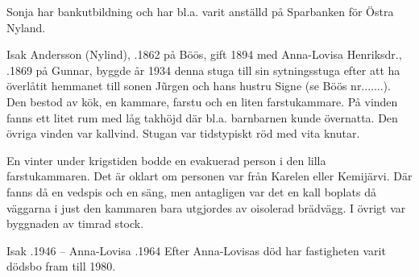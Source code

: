Sonja har bankutbildning och har bl.a. varit anställd på Sparbanken för Östra Nyland.


Isak Andersson (Nylind), .1862 på Böös, gift 1894 med Anna-Lovisa Henriksdr., .1869 på Gunnar, byggde år 1934 denna stuga till sin sytningsstuga efter att ha överlåtit hemmanet till sonen Jũrgen och hans hustru Signe (se Böös nr.......). Den bestod av kök, en kammare, farstu och en liten farstukammare. På vinden fanns ett litet rum med låg takhöjd där bl.a. barnbarnen kunde övernatta. Den övriga vinden var kallvind. Stugan var tidstypiskt röd med vita knutar.

En vinter under krigstiden bodde en evakuerad person i den lilla farstukammaren. Det är oklart om personen var från Karelen eller Kemijärvi. Där fanns då en vedspis och en säng, men antagligen var det en kall boplats då väggarna i just den kammaren bara utgjordes av oisolerad brädvägg. I övrigt var byggnaden av timrad stock.

Isak .1946  -- Anna-Lovisa .1964
Efter Anna-Lovisas död har fastigheten varit dödsbo fram till 1980.
